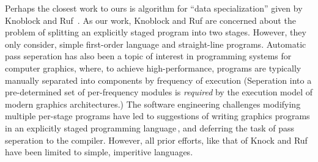 Perhaps the closest work to ours is algorithm for ``data
specialization'' given by Knoblock and Ruf~\cite{knoblock96}.  As our
work, Knoblock and Ruf are concerned about the problem of splitting an
explicitly staged program into two stages.  However, they only
consider, simple first-order language and straight-line
programs. Automatic pass seperation has also been a topic of interest
in programming systems for computer graphics, where, to achieve
high-performance, programs are typically manually separated into
components by frequency of execution (Seperation into a pre-determined
set of per-frequency modules is \emph{required} by the execution model
of modern graphics architectures.)  The software engineering
challenges modifying multiple per-stage programs have led to
suggestions of writing graphics programs in an explicitly staged
programming language\,\cite{Proudfoot:2001,Foley:2011,He:2014}, and
deferring the task of pass seperation to the compiler. However, all
prior efforts, like that of Knock and Ruf\,\cite{knoblock96} have been
limited to simple, imperitive languages.  




